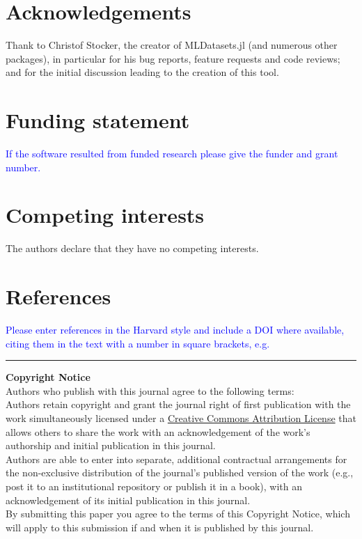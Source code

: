 \documentclass{jors}
\begin{document}
\section*{Acknowledgements}
Thank to Christof Stocker, the creator of MLDatasets.jl (and numerous other packages), in particular for his bug reports, feature requests and code reviews; and for the initial discussion leading to the creation of this tool.

\section*{Funding statement}

\textcolor{blue}{If the software resulted from funded research please give the funder and grant number.}

\section*{Competing interests}
The authors declare that they have no competing interests.

\section*{References}

\textcolor{blue}{Please enter references in the Harvard style and include a DOI where available, citing them in the text with a number in square brackets, e.g. \\ }

\printbibliography

\vspace{2cm}

\rule{\textwidth}{1pt}

{ \bf Copyright Notice} \\
Authors who publish with this journal agree to the following terms: \\

Authors retain copyright and grant the journal right of first publication with the work simultaneously licensed under a  \href{http://creativecommons.org/licenses/by/3.0/}{Creative Commons Attribution License} that allows others to share the work with an acknowledgement of the work's authorship and initial publication in this journal. \\

Authors are able to enter into separate, additional contractual arrangements for the non-exclusive distribution of the journal's published version of the work (e.g., post it to an institutional repository or publish it in a book), with an acknowledgement of its initial publication in this journal. \\

By submitting this paper you agree to the terms of this Copyright Notice, which will apply to this submission if and when it is published by this journal.
\end{document}
